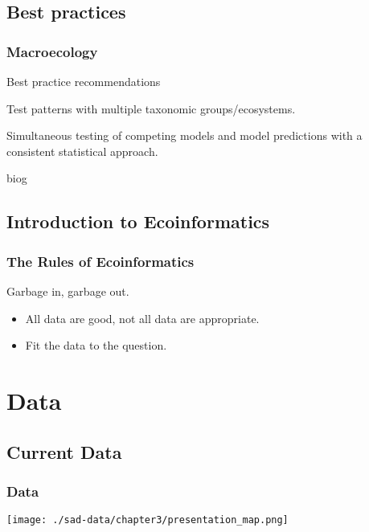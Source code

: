 \documentclass[14pt]{beamer}
\begin{document}
\subsection{Best practices}
\begin{frame}[t]
\frametitle{Macroecology}
Best practice recommendations\\
\begin{itemize}
\begin{small}
\item Test patterns with multiple taxonomic groups/ecosystems.  
\item Simultaneous testing of competing models and model predictions with a consistent statistical approach.
\end{small}
\end{itemize}
\end{frame}
biog\subsection{Introduction to Ecoinformatics}
\begin{frame}[t]
\frametitle{The Rules of Ecoinformatics}
\begin{Large}
Garbage in, garbage out.\\
\end{Large}
\begin{itemize}
\item All data are good, not all data are appropriate.
\item Fit the data to the question.
\end{itemize}
\end{frame}



\section{Data}
\subsection{Current Data}
\begin{frame}[t]
\frametitle{Data}
\vspace{-7pt}
\texttt{[image: ./sad-data/chapter3/presentation\_map.png]}
\end{frame}
\end{document}
